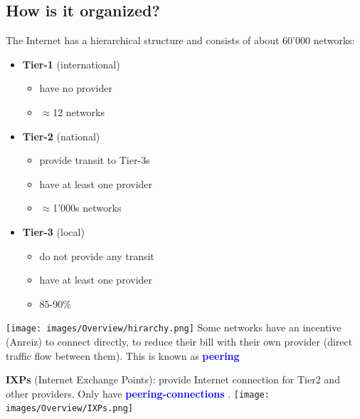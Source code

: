 \documentclass[a4paper, fontsize=8pt, landscape, DIV=1]{scrartcl}
\begin{document}
\begin{multicols*}{4}
			\subsection{How is it organized?}
				The Internet has a hierarchical structure and consists of about 60'000 networks: 
				\begin{itemize}[noitemsep]
					\item \textbf{Tier-1} (international)
					\begin{itemize}
						\item have no provider 
						\item $\approx$12 networks
					\end{itemize}
					\item \textbf{Tier-2} (national)
					\begin{itemize}
						\item provide transit to Tier-3s
						\item have at least one provider 
						\item $\approx$1'000s networks 	
					\end{itemize}
					\item \textbf{Tier-3} (local)
					\begin{itemize}
						\item do not provide any transit
						\item have at least one provider
						\item 85-90\% 
					\end{itemize}
				\end{itemize}
				\texttt{[image: images/Overview/hirarchy.png]}
				Some networks have an incentive (Anreiz) to connect directly, to reduce their bill with their own provider (direct traffic flow between them). This is known as \textcolor{Blue}{\textbf{peering}}\par
				
				\textbf{IXPs} (Internet Exchange Points): provide Internet connection for Tier2 and other providers. Only have \textcolor{Blue}{\textbf{peering-connections}} . 
				\texttt{[image: images/Overview/IXPs.png]}

\end{multicols*}
\end{document}
